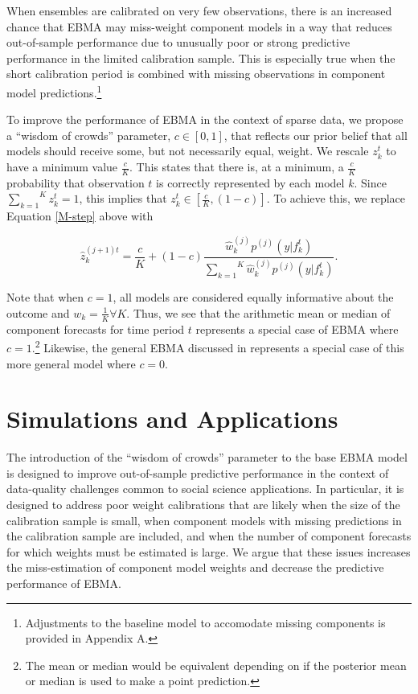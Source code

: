 \documentclass[12pt,fullpage,endnotes]{article}
\begin{document}
When ensembles are calibrated on very few observations, there is an
increased chance that EBMA may miss-weight component models in a way
that reduces out-of-sample performance due to unusually poor or strong
predictive performance in the limited calibration sample. This is
especially true when the short calibration period is combined with
missing observations in component model
predictions.\footnote{Adjustments to the baseline model to accomodate
  missing components is provided in Appendix A.}

To improve the performance of EBMA in the context of sparse data, we
propose a ``wisdom of crowds'' parameter, $c \in [0,1]$, that reflects
our prior belief that all models should receive some, but not
necessarily equal, weight. We rescale $z^t_k$ to have a minimum value
$\frac{c}{K}$.  This states that there is, at a minimum, a
$\frac{c}{K}$ probability that observation $t$ is correctly
represented by each model $k$.  Since
$\overset{K}{\underset{k=1}{\sum}} z_k^t = 1$, this implies that
$z_k^t \in [\frac{c}{K}, (1-c)]$.  To achieve this, we replace
Equation \ref{M-step} above with

\begin{equation}
\hat{z}^{(j+1)t}_{k} = \frac{c}{K} + (1-c)\frac{\hat{w}^{(j)}_k
p^{(j)}(y|f_{k}^{t})}{\overset{K}{\underset{k=1}{\sum}}\hat{w}^{(j)}_kp^{(j)}(y|f_{k}^{t})}.
\end{equation}

Note that when $c=1$, all models are considered equally informative
about the outcome and $w_k=\frac{1}{K} \forall K$. Thus, we see that
the arithmetic mean or median of component forecasts for time period
$t$ represents a special case of EBMA where $c=1$.\footnote{The mean
  or median would be equivalent depending on if the posterior mean or
  median is used to make a point prediction.}  Likewise, the general
EBMA discussed in \citet{mhw:2012} represents a special case of this
more general model where $c=0$.

\section{Simulations and Applications}
\label{empirics}

The introduction of the ``wisdom of crowds'' parameter to the base
EBMA model is designed to improve out-of-sample predictive performance
in the context of data-quality challenges common to social science
applications. In particular, it is designed to address poor weight
calibrations that are likely when the size of the calibration sample
is small, when component models with missing predictions in the calibration sample are included, and
when the number of component forecasts for which weights must be estimated
is large.  We argue that these issues increases the miss-estimation of
component model weights and decrease the predictive performance of
EBMA.
\end{document}
